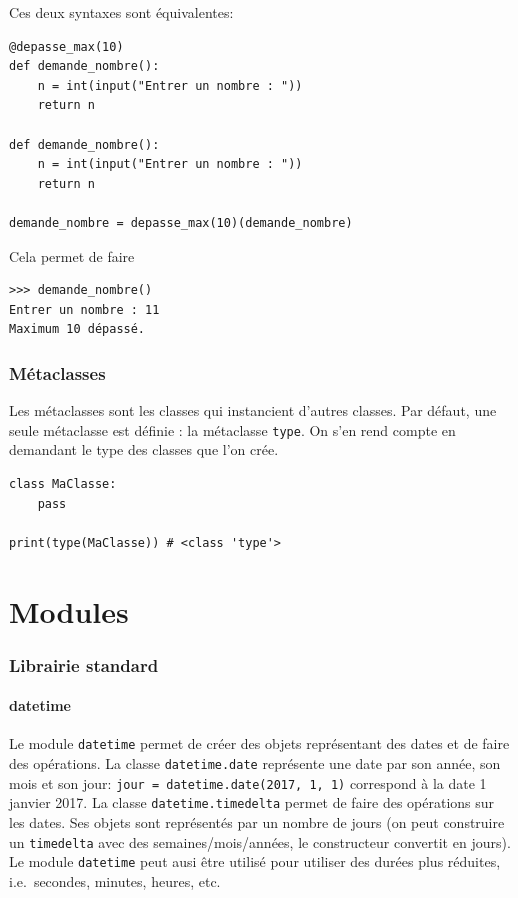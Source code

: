 \documentclass[a4paper, 10pt]{article}
\newcommand{\code}[1]{{\small\texttt{#1}}}
\begin{document}
Ces deux syntaxes sont équivalentes:

\begin{verbatim}
@depasse_max(10)
def demande_nombre():
    n = int(input("Entrer un nombre : "))
    return n

def demande_nombre():
    n = int(input("Entrer un nombre : "))
    return n

demande_nombre = depasse_max(10)(demande_nombre)
\end{verbatim}

Cela permet de faire

\begin{Verbatim}[frame = single, fontsize = \footnotesize]
>>> demande_nombre()
Entrer un nombre : 11
Maximum 10 dépassé.
\end{Verbatim}

\section{Métaclasses}\label{sec:metaclasses}
Les métaclasses sont les classes qui instancient d'autres classes. Par défaut, une seule métaclasse est définie : la métaclasse \code{type}. On s'en rend compte en demandant le type des classes que l'on crée.

\begin{verbatim}
class MaClasse:
    pass

print(type(MaClasse)) # <class 'type'>
\end{verbatim}

\setcounter{section}{0}
\part{Modules}
\section{Librairie standard}
\subsection{datetime}

Le module \code{datetime} permet de créer des objets représentant des dates et de faire des opérations. La classe \code{datetime.date} représente une date par son année, son mois et son jour: \code{jour = datetime.date(2017, 1, 1)} correspond à la date 1\ier{} janvier 2017.
La classe \code{datetime.timedelta} permet de faire des opérations sur les dates. Ses objets sont représentés par un nombre de jours (on peut construire un \code{timedelta} avec des semaines/mois/années, le constructeur convertit en jours).
Le module \code{datetime} peut ausi être utilisé pour utiliser des durées plus réduites, i.e.\ secondes, minutes, heures, etc.
\end{document}
